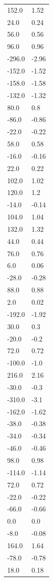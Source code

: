 \begin{longtable}{ll}
152.0 & 1.52 \\
24.0 & 0.24 \\
56.0 & 0.56 \\
96.0 & 0.96 \\
-296.0 & -2.96 \\
-152.0 & -1.52 \\
-158.0 & -1.58 \\
-132.0 & -1.32 \\
80.0 & 0.8 \\
-86.0 & -0.86 \\
-22.0 & -0.22 \\
58.0 & 0.58 \\
-16.0 & -0.16 \\
22.0 & 0.22 \\
102.0 & 1.02 \\
120.0 & 1.2 \\
-14.0 & -0.14 \\
104.0 & 1.04 \\
132.0 & 1.32 \\
44.0 & 0.44 \\
76.0 & 0.76 \\
6.0 & 0.06 \\
-28.0 & -0.28 \\
88.0 & 0.88 \\
2.0 & 0.02 \\
-192.0 & -1.92 \\
30.0 & 0.3 \\
-20.0 & -0.2 \\
72.0 & 0.72 \\
-100.0 & -1.0 \\
216.0 & 2.16 \\
-30.0 & -0.3 \\
-310.0 & -3.1 \\
-162.0 & -1.62 \\
-38.0 & -0.38 \\
-34.0 & -0.34 \\
-46.0 & -0.46 \\
98.0 & 0.98 \\
-114.0 & -1.14 \\
72.0 & 0.72 \\
-22.0 & -0.22 \\
-66.0 & -0.66 \\
0.0 & 0.0 \\
-8.0 & -0.08 \\
164.0 & 1.64 \\
-78.0 & -0.78 \\
18.0 & 0.18 \\

\end{longtable}
